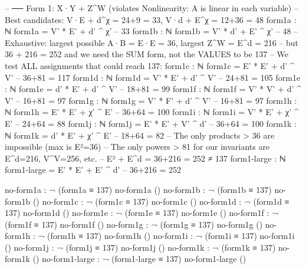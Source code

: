 \documentclass[11pt,a4paper]{article}
\begin{document}
\begin{code}
-- ── Form 1: X·Y + Z^W  (violates Nonlinearity: A is linear in each variable)
-- Best candidates: V·E + d^χ = 24+9 = 33,  V·d + E^χ = 12+36 = 48
form1a : ℕ
form1a = V' * E' + d' ^ χ'                 -- 33
form1b : ℕ
form1b = V' * d' + E' ^ χ'                 -- 48
-- Exhaustive: largest possible A·B = E·E = 36, largest Z^W = E^d = 216
-- but 36 + 216 = 252 and we need the SUM form, not the VALUES to be 137
-- We test ALL assignments that could reach 137:
form1c : ℕ
form1c = E' * E' + d' ^ V'                 -- 36+81 = 117
form1d : ℕ
form1d = V' * E' + d' ^ V'                 -- 24+81 = 105
form1e : ℕ
form1e = d' * E' + d' ^ V'                 -- 18+81 = 99
form1f : ℕ
form1f = V' * V' + d' ^ V'                 -- 16+81 = 97
form1g : ℕ
form1g = V' * F' + d' ^ V'                 -- 16+81 = 97
form1h : ℕ
form1h = E' * E' + χ' ^ E'                 -- 36+64 = 100
form1i : ℕ
form1i = V' * E' + χ' ^ E'                 -- 24+64 = 88
form1j : ℕ
form1j = E' * E' + V' ^ d'                 -- 36+64 = 100
form1k : ℕ
form1k = d' * E' + χ' ^ E'                 -- 18+64 = 82
-- The only products > 36 are impossible (max is E²=36)
-- The only powers > 81 for our invariants are E^d=216, V^V=256, etc.
-- E² + E^d = 36+216 = 252 ≠ 137
form1-large : ℕ
form1-large = E' * E' + E' ^ d'            -- 36+216 = 252

no-form1a : ¬ (form1a ≡ 137)
no-form1a ()
no-form1b : ¬ (form1b ≡ 137)
no-form1b ()
no-form1c : ¬ (form1c ≡ 137)
no-form1c ()
no-form1d : ¬ (form1d ≡ 137)
no-form1d ()
no-form1e : ¬ (form1e ≡ 137)
no-form1e ()
no-form1f : ¬ (form1f ≡ 137)
no-form1f ()
no-form1g : ¬ (form1g ≡ 137)
no-form1g ()
no-form1h : ¬ (form1h ≡ 137)
no-form1h ()
no-form1i : ¬ (form1i ≡ 137)
no-form1i ()
no-form1j : ¬ (form1j ≡ 137)
no-form1j ()
no-form1k : ¬ (form1k ≡ 137)
no-form1k ()
no-form1-large : ¬ (form1-large ≡ 137)
no-form1-large ()
\end{code}
\end{document}
